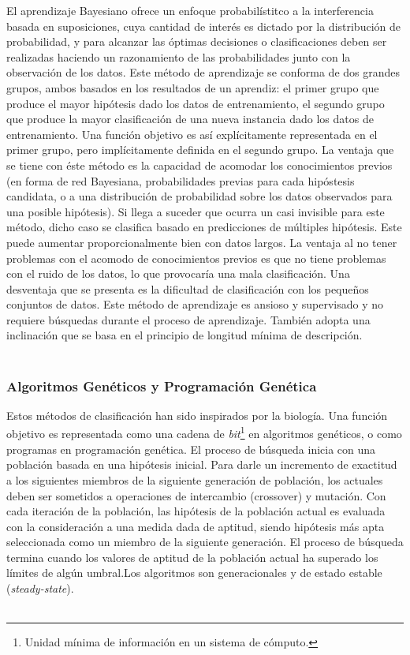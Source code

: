 	El aprendizaje Bayesiano ofrece un enfoque probabilístitco a la interferencia basada en suposiciones, cuya cantidad de interés es dictado por la distribución de probabilidad, y para alcanzar las óptimas decisiones o clasificaciones deben ser realizadas haciendo un razonamiento de las probabilidades junto con la observación de los datos. Este método de aprendizaje se conforma de dos grandes grupos, ambos basados en los resultados de un aprendiz: el primer grupo que produce el mayor hipótesis dado los datos de entrenamiento, el segundo grupo que produce la mayor clasificación de una nueva instancia dado los datos de entrenamiento. Una función objetivo es así explícitamente representada en el primer grupo, pero implícitamente definida en el segundo grupo. La ventaja que se tiene con éste método es la capacidad de acomodar los conocimientos previos (en forma de red Bayesiana, probabilidades previas para cada hipóstesis candidata, o a una distribución de probabilidad sobre los datos observados para una posible hipótesis). Si llega a suceder que ocurra un casi invisible para este método, dicho caso se clasifica basado en predicciones de múltiples hipótesis. Este puede aumentar proporcionalmente bien con datos largos. La ventaja al no tener problemas con el acomodo de conocimientos previos es que no tiene problemas con el ruido de los datos, lo que provocaría una mala clasificación. Una desventaja que se presenta es la dificultad de clasificación con los pequeños conjuntos de datos. Este método de aprendizaje es ansioso y supervisado y no requiere búsquedas durante el proceso de aprendizaje. También adopta una inclinación que se basa en el principio de longitud mínima de descripción.\\ \\
	

	\subsubsection{Algoritmos Genéticos y Programación Genética}

	Estos métodos de clasificación han sido inspirados por la biología. Una función objetivo es representada como una cadena de \textit{bit}\footnote{Unidad mínima de información en un sistema de cómputo.} en algoritmos genéticos, o como programas en programación genética. El proceso de búsqueda inicia con una población basada en una hipótesis inicial. Para darle un incremento de exactitud a los siguientes miembros de la siguiente generación de población, los actuales deben ser sometidos a operaciones de intercambio (crossover) y mutación. Con cada iteración de la población, las hipótesis de la población actual es evaluada con la consideración a una medida dada de aptitud, siendo hipótesis más apta seleccionada como un miembro de la siguiente generación. El proceso de búsqueda termina cuando los valores de aptitud de la población actual ha superado los límites de algún umbral.Los algoritmos son generacionales y de estado estable (\textit{steady-state}).\\ \\
	


